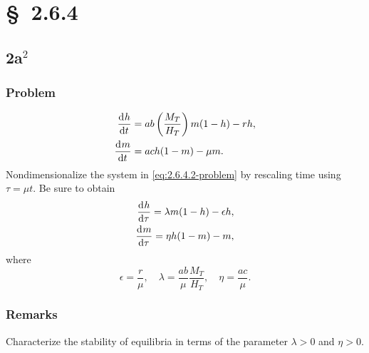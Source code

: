 \documentclass[12pt]{article}
\begin{document}
\newpage
\section{\S~2.6.4}
\subsection{2a$^2$}
\subsubsection*{Problem}
\begin{equation}
  \label{eq:2.6.4.2-problem}
  \begin{aligned}
    \frac{\mathrm{d}^{} {h}}{\mathrm{d}{t}^{}} &= ab\left( \frac{M_T}{H_T} \right)m(1-h)-rh, \\
    \frac{\mathrm{d}^{} {m}}{\mathrm{d}{t}^{}} &= ach(1-m)-\mu m. \\
  \end{aligned}
\end{equation}
Nondimensionalize the system in \cref{eq:2.6.4.2-problem} by rescaling time
using $\tau = \mu t$. Be sure to obtain
\begin{equation*}
  \begin{aligned}
    \frac{\mathrm{d}^{} {h}}{\mathrm{d}{\tau}^{}} = \lambda m(1-h) - \epsilon h, \\
    \frac{\mathrm{d}^{} {m}}{\mathrm{d}{\tau}^{}} = \eta h(1-m) - m,
  \end{aligned}
\end{equation*}
where
\begin{equation*}
  \epsilon=\frac{r}{\mu},\quad \lambda=\frac{ab}{\mu}\frac{M_T}{H_T},\quad\eta=\frac{ac}{\mu}.
\end{equation*}

\subsubsection*{Remarks}
Characterize the stability of equilibria in terms of the parameter $\lambda>0$
and $\eta>0$.
\end{document}
